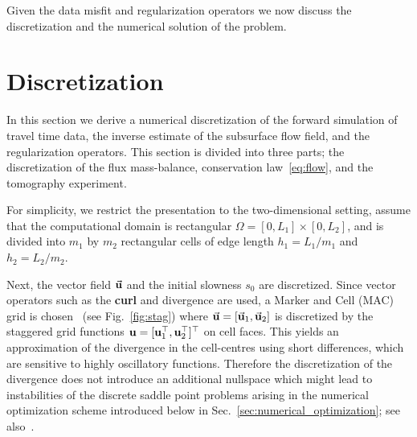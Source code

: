 \documentclass[english]{siamltex}
\newcommand {\bfu}   { {\bf u} }
\newcommand {\vu}  { {\vec {\bf  u}} }   %
\begin{document}
Given the data misfit and regularization operators we now discuss the discretization and the
numerical solution of the problem.

\section{Discretization} %
\label{sec:numerical_methods_for_the_forward_problem}

In this section we derive a numerical discretization of the forward simulation of travel time data, the inverse estimate of the subsurface flow field, 
and the regularization operators.   
This section is divided into 
three parts;  the discretization of the flux mass-balance, conservation law~\eqref{eq:flow}, and the tomography experiment. 

For simplicity, we restrict the presentation to the two-dimensional setting, assume that the computational domain is rectangular $\Omega = [0,L_{1}]\times [0,L_{2}]$, and is divided into $m_{1}$ by $m_{2}$ rectangular
cells of edge length $h_{1}=L_{1}/m_{1}$ and $h_{2} = L_{2}/m_{2}$. 

Next, the vector field $\vu$ and the initial slowness $s_{0}$ are discretized. Since 
vector operators such as the {\bf curl} and divergence are used, a Marker and Cell (MAC) grid is chosen~\cite{fletcher} 
(see Fig.~\ref{fig:stag})
where $\vu = [\vu_{1},\vu_{2}]$ is discretized by the staggered grid functions $\bfu = [\bfu_{1}^{\top}, \bfu_{2}^{\top}]^{\top}$
on cell faces. This yields an approximation of the divergence in the cell-centres using short differences, which are sensitive to highly oscillatory functions. Therefore the discretization of the divergence does not introduce an additional nullspace which might lead to instabilities of the discrete saddle point problems arising in the numerical optimization scheme introduced below in Sec.~\ref{sec:numerical_optimization}; see also~\cite{fletcher,sekw}.
\end{document}
